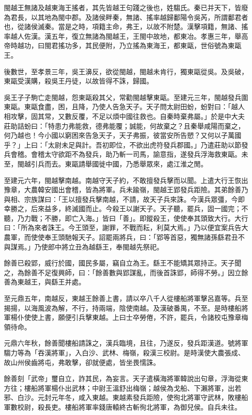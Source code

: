 
\begin{pinyinscope}
閩越王無諸及越東海王搖者，其先皆越王句踐之後也，姓騶氏。秦已并天下，皆廢為君長，以其地為閩中郡。及諸侯畔秦，無諸、搖率越歸鄱陽令吳芮，所謂鄱君者也，從諸侯滅秦。當是之時，項籍主命，弗王，以故不附楚。漢擊項籍，無諸、搖率越人佐漢。漢五年，復立無諸為閩越王，王閩中故地，都東冶。孝惠三年，舉高帝時越功，曰閩君搖功多，其民便附，乃立搖為東海王，都東甌，世俗號為東甌王。

後數世，至孝景三年，吳王濞反，欲從閩越，閩越未肯行，獨東甌從吳。及吳破，東甌受漢購，殺吳王丹徒，以故皆得不誅，歸國。

吳王子子駒亡走閩越，怨東甌殺其父，常勸閩越擊東甌。至建元三年，閩越發兵圍東甌。東甌食盡，困，且降，乃使人告急天子。天子問太尉田蚡，蚡對曰：「越人相攻擊，固其常，又數反覆，不足以煩中國往救也。自秦時棄弗屬。」於是中大夫莊助詰蚡曰：「特患力弗能救，德弗能覆；誠能，何故棄之？且秦舉咸陽而棄之，何乃越也！今小國以窮困來告急天子，天子弗振，彼當安所告愬？又何以子萬國乎？」上曰：「太尉未足與計。吾初即位，不欲出虎符發兵郡國。」乃遣莊助以節發兵會稽。會稽太守欲距不為發兵，助乃斬一司馬，諭意指，遂發兵浮海救東甌。未至，閩越引兵而去。東甌請舉國徙中國，乃悉舉眾來，處江淮之閒。

至建元六年，閩越擊南越。南越守天子約，不敢擅發兵擊而以聞。上遣大行王恢出豫章，大農韓安國出會稽，皆為將軍。兵未踰嶺，閩越王郢發兵距險。其弟餘善乃與相、宗族謀曰：「王以擅發兵擊南越，不請，故天子兵來誅。今漢兵眾彊，今即幸勝之，后來益多，終滅國而止。今殺王以謝天子。天子聽，罷兵，固一國完；不聽，乃力戰；不勝，即亡入海。」皆曰「善」。即鏦殺王，使使奉其頭致大行。大行曰：「所為來者誅王。今王頭至，謝罪，不戰而耘，利莫大焉。」乃以便宜案兵告大農軍，而使使奉王頭馳報天子。詔罷兩將兵，曰：「郢等首惡，獨無諸孫繇君丑不與謀焉。」乃使郎中將立丑為越繇王，奉閩越先祭祀。

餘善已殺郢，威行於國，國民多屬，竊自立為王。繇王不能矯其眾持正。天子聞之，為餘善不足復興師，曰：「餘善數與郢謀亂，而後首誅郢，師得不勞。」因立餘善為東越王，與繇王并處。

至元鼎五年，南越反，東越王餘善上書，請以卒八千人從樓船將軍擊呂嘉等。兵至揭揚，以海風波為解，不行，持兩端，陰使南越。及漢破番禺，不至。是時樓船將軍楊仆使使上書，願便引兵擊東越。上曰士卒勞倦，不許，罷兵，令諸校屯豫章梅領待命。

元鼎六年秋，餘善聞樓船請誅之，漢兵臨境，且往，乃遂反，發兵距漢道。號將軍騶力等為「吞漢將軍」，入白沙、武林、梅嶺，殺漢三校尉。是時漢使大農張成、故山州侯齒將屯，弗敢擊，卻就便處，皆坐畏懦誅。

餘善刻「武帝」璽自立，詐其民，為妄言。天子遣橫海將軍韓說出句章，浮海從東方往；樓船將軍楊仆出武林；中尉王溫舒出梅嶺；越侯為戈船、下瀨將軍，出若邪、白沙。元封元年冬，咸入東越。東越素發兵距險，使徇北將軍守武林，敗樓船軍數校尉，殺長吏。樓船將軍率錢唐轅終古斬徇北將軍，為御兒侯。自兵未往。


\end{pinyinscope}
